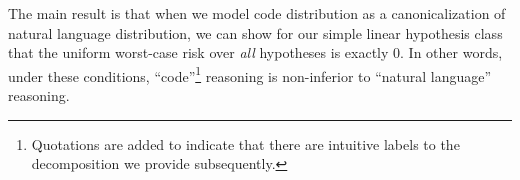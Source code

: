 The main result is that when we model code distribution as a canonicalization of natural language distribution, we can show for our simple linear hypothesis class that the uniform worst-case risk over \emph{all} hypotheses is exactly 0. In other words, under these conditions, ``code''\footnote{Quotations are added to indicate that there are intuitive labels to the decomposition we provide subsequently.} reasoning is non-inferior to ``natural language'' reasoning.








